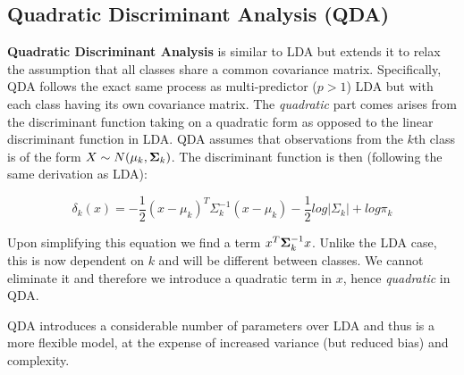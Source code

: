 \subsection{Quadratic Discriminant Analysis (QDA)}

\textbf{Quadratic Discriminant Analysis} is similar to LDA but extends it to relax the assumption that all classes share a common covariance matrix. Specifically, QDA follows the exact same process as multi-predictor ($p>1$) LDA but with each class having its own covariance matrix. The \textit{quadratic} part comes arises from the discriminant function taking on a quadratic form as opposed to the linear discriminant function in LDA. QDA assumes that observations from the $k$th class is of the form $X\sim N(\mu_{k},\mathbf{\Sigma}_{k})$. The discriminant function is then (following the same derivation as LDA):

$$ \delta_{k}(x) = -\frac{1}{2} (x-\mu_{k})^{T}\Sigma_{k}^{-1}(x-\mu_{k}) -\frac{1}{2} log|\Sigma_{k}| + log\pi_{k} $$

Upon simplifying this equation we find a term $x^{T}\mathbf{\Sigma}^{-1}_{k}x$. Unlike the LDA case, this is now dependent on $k$ and will be different between classes. We cannot eliminate it and therefore we introduce a quadratic term in $x$, hence \textit{quadratic} in QDA.

QDA introduces a considerable number of parameters over LDA and thus is a more flexible model, at the expense of increased variance (but reduced bias) and complexity.
